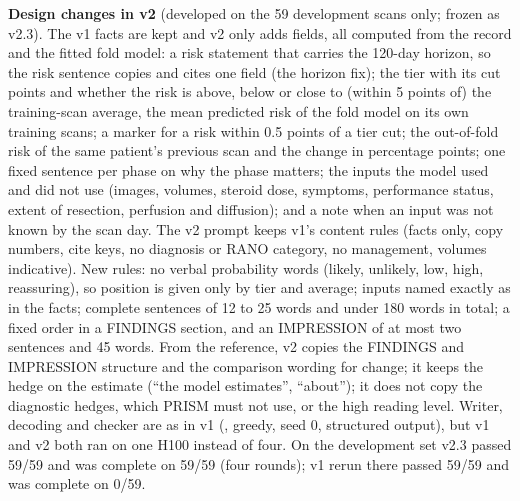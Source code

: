 \documentclass[11pt,a4paper]{article}
\begin{document}
\textbf{Design changes in v2} (developed on the 59 development scans only; frozen as v2.3). The v1 facts are kept and
v2 only adds fields, all computed from the record and the fitted fold model: a risk statement that carries the
120-day horizon, so the risk sentence copies and cites one field (the horizon fix); the tier with its cut points and
whether the risk is above, below or close to (within 5 points of) the training-scan average, the mean predicted risk
of the fold model on its own training scans; a marker for a risk within 0.5 points of a tier cut; the out-of-fold
risk of the same patient's previous scan and the change in percentage points; one fixed sentence per phase on why
the phase matters; the inputs the model used and did not use (images, volumes, steroid dose, symptoms, performance
status, extent of resection, perfusion and diffusion); and a note when an input was not known by the scan day. The
v2 prompt keeps v1's content rules (facts only, copy numbers, cite keys, no diagnosis or RANO category, no management,
volumes indicative). New rules: no verbal probability words (likely, unlikely, low, high, reassuring), so position is
given only by tier and average; inputs named exactly as in the facts; complete sentences of 12 to 25 words and under
180 words in total; a fixed order in a FINDINGS section, and an IMPRESSION of at most two sentences and 45 words.
From the reference, v2 copies the FINDINGS and IMPRESSION structure and the comparison wording for change; it keeps
the hedge on the estimate (``the model estimates'', ``about''); it does not copy the diagnostic hedges, which PRISM
must not use, or the high reading level. Writer, decoding and checker are as in v1 (, greedy,
seed 0, structured output), but v1 and v2 both ran on one H100 instead of four. On the development set v2.3 passed
59/59 and was complete on 59/59 (four rounds); v1 rerun there passed 59/59 and was complete on 0/59.
\end{document}
